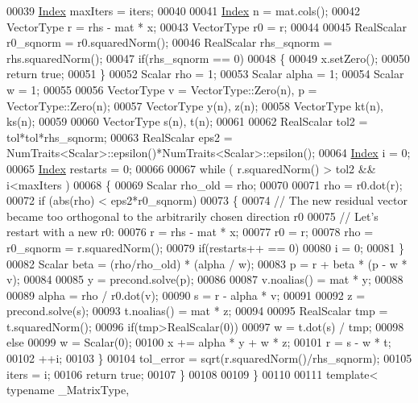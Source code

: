 \begin{DoxyCode}
00039   \hyperlink{namespace_eigen_a62e77e0933482dafde8fe197d9a2cfde}{Index} maxIters = iters;
00040 
00041   \hyperlink{namespace_eigen_a62e77e0933482dafde8fe197d9a2cfde}{Index} n = mat.cols();
00042   VectorType r  = rhs - mat * x;
00043   VectorType r0 = r;
00044   
00045   RealScalar r0\_sqnorm = r0.squaredNorm();
00046   RealScalar rhs\_sqnorm = rhs.squaredNorm();
00047   \textcolor{keywordflow}{if}(rhs\_sqnorm == 0)
00048   \{
00049     x.setZero();
00050     \textcolor{keywordflow}{return} \textcolor{keyword}{true};
00051   \}
00052   Scalar rho    = 1;
00053   Scalar alpha  = 1;
00054   Scalar w      = 1;
00055   
00056   VectorType v = VectorType::Zero(n), p = VectorType::Zero(n);
00057   VectorType y(n),  z(n);
00058   VectorType kt(n), ks(n);
00059 
00060   VectorType s(n), t(n);
00061 
00062   RealScalar tol2 = tol*tol*rhs\_sqnorm;
00063   RealScalar eps2 = NumTraits<Scalar>::epsilon()*NumTraits<Scalar>::epsilon();
00064   \hyperlink{namespace_eigen_a62e77e0933482dafde8fe197d9a2cfde}{Index} i = 0;
00065   \hyperlink{namespace_eigen_a62e77e0933482dafde8fe197d9a2cfde}{Index} restarts = 0;
00066 
00067   \textcolor{keywordflow}{while} ( r.squaredNorm() > tol2 && i<maxIters )
00068   \{
00069     Scalar rho\_old = rho;
00070 
00071     rho = r0.dot(r);
00072     \textcolor{keywordflow}{if} (abs(rho) < eps2*r0\_sqnorm)
00073     \{
00074       \textcolor{comment}{// The new residual vector became too orthogonal to the arbitrarily chosen direction r0}
00075       \textcolor{comment}{// Let's restart with a new r0:}
00076       r  = rhs - mat * x;
00077       r0 = r;
00078       rho = r0\_sqnorm = r.squaredNorm();
00079       \textcolor{keywordflow}{if}(restarts++ == 0)
00080         i = 0;
00081     \}
00082     Scalar beta = (rho/rho\_old) * (alpha / w);
00083     p = r + beta * (p - w * v);
00084     
00085     y = precond.solve(p);
00086     
00087     v.noalias() = mat * y;
00088 
00089     alpha = rho / r0.dot(v);
00090     s = r - alpha * v;
00091 
00092     z = precond.solve(s);
00093     t.noalias() = mat * z;
00094 
00095     RealScalar tmp = t.squaredNorm();
00096     \textcolor{keywordflow}{if}(tmp>RealScalar(0))
00097       w = t.dot(s) / tmp;
00098     \textcolor{keywordflow}{else}
00099       w = Scalar(0);
00100     x += alpha * y + w * z;
00101     r = s - w * t;
00102     ++i;
00103   \}
00104   tol\_error = sqrt(r.squaredNorm()/rhs\_sqnorm);
00105   iters = i;
00106   \textcolor{keywordflow}{return} \textcolor{keyword}{true}; 
00107 \}
00108 
00109 \}
00110 
00111 \textcolor{keyword}{template}< \textcolor{keyword}{typename} \_MatrixType,

\end{DoxyCode}
